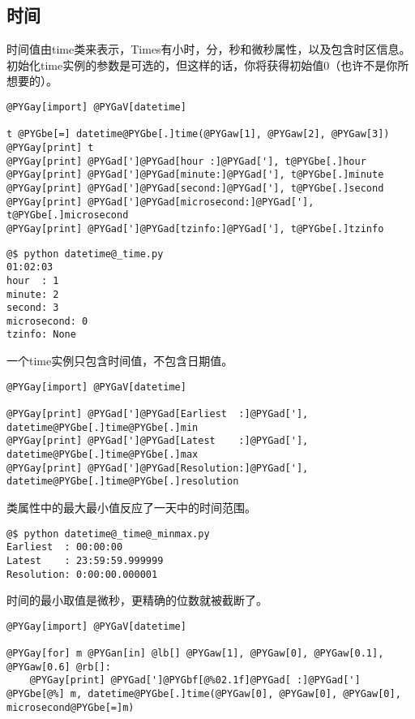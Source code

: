 \documentclass[a4paper,10pt,english]{manual}
\begin{document}
\subsection{时间}

时间值由time类来表示，Times有小时，分，秒和微秒属性，以及包含时区信息。初始化time实例的参数是可选的，但这样的话，你将获得初始值0（也许不是你所想要的）。

\begin{Verbatim}[commandchars=@\[\]]
@PYGay[import] @PYGaV[datetime]

t @PYGbe[=] datetime@PYGbe[.]time(@PYGaw[1], @PYGaw[2], @PYGaw[3])
@PYGay[print] t
@PYGay[print] @PYGad[']@PYGad[hour :]@PYGad['], t@PYGbe[.]hour
@PYGay[print] @PYGad[']@PYGad[minute:]@PYGad['], t@PYGbe[.]minute
@PYGay[print] @PYGad[']@PYGad[second:]@PYGad['], t@PYGbe[.]second
@PYGay[print] @PYGad[']@PYGad[microsecond:]@PYGad['], t@PYGbe[.]microsecond
@PYGay[print] @PYGad[']@PYGad[tzinfo:]@PYGad['], t@PYGbe[.]tzinfo
\end{Verbatim}

\begin{Verbatim}[commandchars=@\[\]]
@$ python datetime@_time.py
01:02:03
hour  : 1
minute: 2
second: 3
microsecond: 0
tzinfo: None
\end{Verbatim}

一个time实例只包含时间值，不包含日期值。

\begin{Verbatim}[commandchars=@\[\]]
@PYGay[import] @PYGaV[datetime]

@PYGay[print] @PYGad[']@PYGad[Earliest  :]@PYGad['], datetime@PYGbe[.]time@PYGbe[.]min
@PYGay[print] @PYGad[']@PYGad[Latest    :]@PYGad['], datetime@PYGbe[.]time@PYGbe[.]max
@PYGay[print] @PYGad[']@PYGad[Resolution:]@PYGad['], datetime@PYGbe[.]time@PYGbe[.]resolution
\end{Verbatim}

类属性中的最大最小值反应了一天中的时间范围。

\begin{Verbatim}[commandchars=@\[\]]
@$ python datetime@_time@_minmax.py
Earliest  : 00:00:00
Latest    : 23:59:59.999999
Resolution: 0:00:00.000001
\end{Verbatim}

时间的最小取值是微秒，更精确的位数就被截断了。

\begin{Verbatim}[commandchars=@\[\]]
@PYGay[import] @PYGaV[datetime]

@PYGay[for] m @PYGan[in] @lb[] @PYGaw[1], @PYGaw[0], @PYGaw[0.1], @PYGaw[0.6] @rb[]:
    @PYGay[print] @PYGad[']@PYGbf[@%02.1f]@PYGad[ :]@PYGad['] @PYGbe[@%] m, datetime@PYGbe[.]time(@PYGaw[0], @PYGaw[0], @PYGaw[0], microsecond@PYGbe[=]m)
\end{Verbatim}
\end{document}
